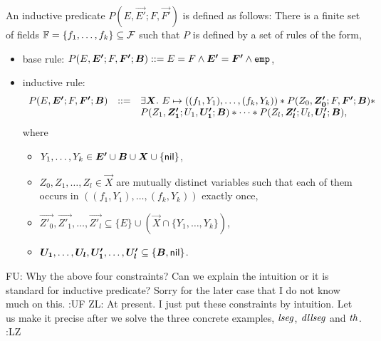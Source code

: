 \documentclass{llncs}
\newcommand{\zhilin}[1]{\color{red} {ZL: #1 :LZ} \color{black}}
\newcommand{\fu}[1]{\color{purple} {FU: #1 :UF} \color{black}}
\begin{document}
%

An inductive predicate $P(E, \vec{E'}; F, \vec{F'})$ is defined as follows: There is a finite set of fields $\mathbb{F} = \{f_1,\dots, f_k\} \subseteq \mathcal{F}$ such that $P$ is defined by a set of rules of the form,
\begin{itemize}
\item base rule: $P(E, \vec{E'}; F, \vec{F'}; \vec{B}) ::=  E = F \wedge \vec{E'} = \vec{F'} \wedge \slemp$,

\item inductive rule:
\[
\begin{array}{l c l }
P(E, \vec{E'}; F, \vec{F'}; \vec{B})  & ::=  & \exists \vec{X}.\ E \mapsto ((f_1, Y_1),\dots,(f_k, Y_k)) * P(Z_0, \vec{Z'_0}; F, \vec{F'}; \vec{B}) *\\
& &  P(Z_1, \vec{Z'_1}; U_1, \vec{U'_1}; \vec{B}) * \dots *  P(Z_l, \vec{Z'_l}; U_l, \vec{U'_l}; \vec{B}),
\end{array}
\]
where
\begin{itemize}
\item $Y_1,\dots, Y_k \in \vec{E'} \cup \vec{B} \cup \vec{X} \cup \{\nil \}$,
%
\item $Z_0, Z_1,\dots, Z_l \in \vec{X}$ are mutually distinct variables such that each of them occurs in $ ((f_1, Y_1),\dots,(f_k, Y_k))$ exactly once,
%
\item $\vec{Z'_0},  \vec{Z'_1},\dots, \vec{Z'_l} \subseteq  \{E\} \cup (\vec{X} \cap \{Y_1,\dots,Y_k\})$,
%
\item $\vec{U_1},\dots, \vec{U_l}, \vec{U'_1},\dots, \vec{U'_l} \subseteq \{\vec{B},\nil\} $.
\end{itemize}
\end{itemize}
\fu{Why the above four constraints? Can we explain the intuition or it is standard for inductive predicate? Sorry for the later case that I do not know much on this.} \zhilin{At present. I just put these constraints by intuition. Let us make it precise after we solve the three concrete examples, $\mathit{lseg}$, $\mathit{dllseg}$ and $\mathit{th}$.}
%
\end{document}
